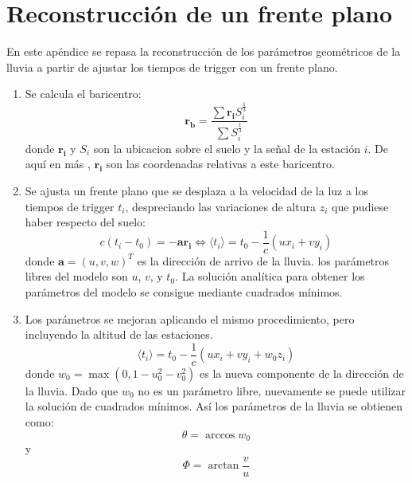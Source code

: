 \chapter{Reconstrucción de un frente plano}
\label{ap:topDown}

En este apéndice se repasa la reconstrucción de los parámetros geométricos de la lluvia a partir de ajustar los tiempos de trigger con un frente plano.

\begin{enumerate}
\item Se calcula el baricentro:
\begin{equation}
\boldsymbol{r_{b}} =\frac{\sum \boldsymbol{r_{i}}S_{i}^{\frac{1}{3}}}{\sum S_{i}^{\frac{1}{3}}}
\end{equation}
donde $\boldsymbol{r_{i}}$ y $S_{i}$ son la ubicacion sobre el suelo y la señal de la estación $i$.
De aquí en más , $\boldsymbol{r_{i}}$ son las coordenadas relativas a este baricentro.
\item Se ajusta un frente plano que se desplaza a la velocidad de la luz a los tiempos de trigger $t_i$, despreciando las variaciones de altura $z_{i}$ que pudiese haber respecto del suelo:
\begin{equation}
c(t_{i} -t_{0} )=-\boldsymbol{a}\boldsymbol{r_{i}} \Longleftrightarrow \langle t_{i}\rangle = t_{0} - \frac{1}{c}(ux_{i} + vy_{i} )
\end{equation}
donde $\boldsymbol{a} = (u, v, w)^{T}$ es la dirección de arrivo de la lluvia.
los parámetros libres del modelo son $u$, $v$, y $t_{0}$.
La solución analítica para obtener los parámetros del modelo se consigue mediante cuadrados mínimos.

\item Los parámetros se mejoran aplicando el mismo procedimiento, pero incluyendo la altitud de las estaciones. 
\begin{equation}
\langle t_{i}\rangle = t_{0} - \frac{1}{c}(ux_{i} + vy_{i} +w_{0}z_{i})
\end{equation}
donde $w_{0} = \max{(0, 1 - u_{0}^2 - v_{0}^{2} )}$  es la nueva componente de la dirección de la lluvia.
Dado que $w_{0}$ no es un parámetro libre, nuevamente se puede utilizar la solución de cuadrados mínimos.
Así los parámetros de la lluvia se obtienen como:
\begin{equation}
\theta = \arccos w_{0}
\end{equation}
y
\begin{equation}
\Phi = \arctan \frac{v}{u}
\end{equation}




\end{enumerate}

